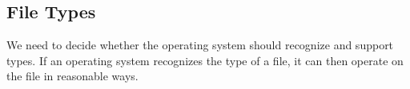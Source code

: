 \subsection{File Types}\label{subsec:File_Types}
We need to decide whether the operating system should recognize and support  types.
If an operating system recognizes the type of a file, it can then operate on the file in reasonable ways.


